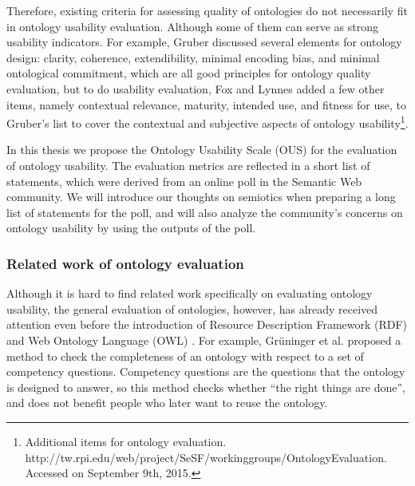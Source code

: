 Therefore, existing criteria for assessing quality of ontologies do not necessarily fit in ontology usability evaluation. Although some of them can serve as strong usability indicators. For example, Gruber \cite{gruber1995toward}
discussed several elements for ontology design: clarity, coherence, extendibility, minimal encoding bias, and minimal ontological commitment, which are all good principles for ontology quality evaluation, but to do usability evaluation, Fox and Lynnes added a few other items, namely contextual relevance, maturity, intended use, and fitness for use, to Gruber's list to cover the contextual and subjective aspects of ontology usability\footnote{Additional items for ontology evaluation. http://tw.rpi.edu/web/project/SeSF/workinggroups/OntologyEvaluation. Accessed on September 9th, 2015.}.

In this thesis we propose the Ontology Usability Scale (OUS) for the evaluation of ontology usability. The evaluation metrics are reflected in a short list of statements, which were derived from an online poll in the Semantic Web community. We will introduce our thoughts on semiotics when preparing a long list of statements for the poll, and will also analyze the community's concerns on ontology usability by using the outputs of the poll.

\subsubsection{Related work of ontology evaluation}
Although it is hard to find related work specifically on evaluating ontology usability, the general evaluation of ontologies, however, has already received attention even before the introduction of Resource Description Framework (RDF) \cite{brickley2000resource} and Web Ontology Language (OWL) \cite{mcguinness2004owl}. For example, Gr{\"u}ninger et al. \cite{gruninger1995methodology} proposed a method to check the completeness of an ontology with respect to a set of competency questions. Competency questions are the questions that the ontology is designed to answer, so this method checks whether ``the right things are done'', and does not benefit people who later want to reuse the ontology.


